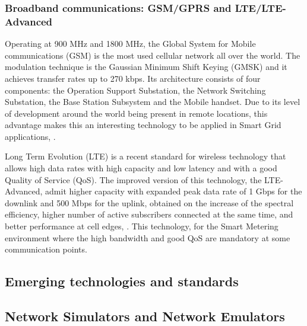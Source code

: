 \subsubsection{Broadband communications: GSM/GPRS and LTE/LTE-Advanced}

Operating at 900 MHz and 1800 MHz, the Global System for Mobile communications (GSM) is the most used cellular network all over the world. The modulation technique is the Gaussian Minimum Shift Keying (GMSK) and it achieves transfer rates up to 270 kbps. Its architecture consists of four components: the Operation Support Substation, the Network Switching Substation, the Base Station Subsystem and the Mobile handset. Due to its level of development around the world being present in remote locations, this advantage makes this  an interesting technology to be applied in Smart Grid applications, \cite{Usman2013}.

Long Term Evolution (LTE) is a recent standard for wireless technology that allows high data rates with high capacity and low latency and with a good Quality of Service (QoS). The improved version of this technology, the LTE-Advanced, admit higher capacity with expanded peak data rate of 1 Gbps for the downlink and 500 Mbps for the uplink, obtained on the increase of the spectral efficiency, higher  number of active subscribers connected at the same time, and better performance at cell edges, \cite{Mohassel2014}. This technology, for the Smart Metering environment where the high bandwidth and good QoS are mandatory at some communication points.




\subsection{Emerging technologies and standards}

\subsection{Network Simulators and Network Emulators}

